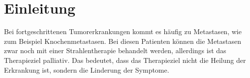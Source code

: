 \section{Einleitung}

Bei fortgeschrittenen Tumorerkrankungen kommt es häufig zu Metastasen, wie zum
Beispiel Knochenmetastasen. Bei diesen Patienten können die Metastasen zwar noch
mit einer Strahlentherapie behandelt werden, allerdings ist das Therapieziel palliativ.
Das bedeutet, dass das Therapieziel nicht die Heilung der Erkrankung ist, sondern
die Linderung der Symptome.
